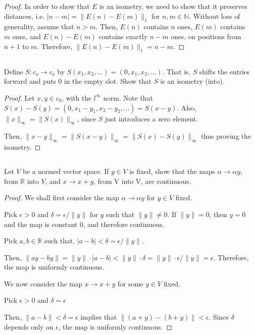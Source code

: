 \begin{proof}
In order to show that $E$ is an isometry, we need to show that it preserves distances, i.e. $|n-m| = \|E(n) - E(m)\|_1$ for $n,m \in \mathbb{N}$. Without loss of generality, assume that $n>m$. Then, $E(n)$ contains $n$ ones, $E(m)$ contains $m$ ones, and $E(n) - E(m)$ contains exactly $n-m$ ones, on positions from $n+1$ to $m$. Therefore, $\|E(n) - E(m)\|_1 = n-m$.

\end{proof}

\subsection{} Define $S : c_o \rightarrow c_o$ by $S(x_1, x_2, \dots ) = (0, x_1, x_2, \dots )$. That is, $S$ shifts the entries forward and puts 0 in the empty slot. Show that $S$ is an isometry (into). 

\begin{proof}
Let $x,y \in c_0$, with the $l^\infty$ norm. Note that $S(x) - S(y) = (0, x_1-y_1, x_2-y_2, \dots) = S(x-y)$. Also, $\|x\|_\infty = \|S(x)\|_\infty$, since $S$ just introduces a zero element.

Then, $\|x-y\|_\infty = \|S(x-y)\|_\infty = \|S(x) - S(y)\|_\infty$ thus proving the isometry.

\end{proof}

\subsection{} Let $V$ be a normed vector space. If $y \in V$ is fixed, show that the maps $\alpha \rightarrow \alpha y$, from $\mathbb{R}$ into $V$, and $x \rightarrow x + y$, from V into V, are continuous. 

\begin{proof}
We shall first consider the map $\alpha \rightarrow \alpha y$ for $y \in V$ fixed.

Pick $\epsilon > 0$ and $\delta = \epsilon/\|y\|$ for $y$ such that $\|y\| \neq 0$. If $\|y\|=0$, then $y=0$ and the map is constant 0, and therefore continuous.

Pick $a,b \in \mathbb{R}$ such that, $|a-b| < \delta = \epsilon/\|y\|$.

Then, $\|ay - by\| = \|y\|\cdot|a - b| < \|y\| \cdot \delta = \|y\| \cdot \epsilon/\|y\| = \epsilon$. Therefore, the map is uniformly continuous.

\vspace{1em}

We now consider the map $x \rightarrow x+y$ for some $y \in V$ fixed.

Pick $\epsilon > 0$ and $\delta = \epsilon$

Then, $\|a - b\| < \delta = \epsilon$ implies that $\|(a + y) - (b + y)\| < \epsilon$. Since $\delta$ depends only on $\epsilon$, the map is uniformly continuous. 
\end{proof}

